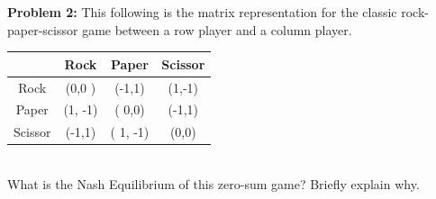 \documentclass[a4paper]{article}
\newif\ifsol
\begin{document}
    \noindent \textbf{Problem 2:} This following is the matrix representation for the classic rock-paper-scissor game between a row player and a column player.\\
    \begin{table}[h]
    	\center
    	\begin{tabular}{|c|c|c|c|}
    		\hline
    	&Rock&Paper&Scissor\\
    		\hline
    		Rock& (0,0 )& (-1,1)& (1,-1)\\
    		\hline
    		Paper&(1, -1)& ( 0,0) & (-1,1)\\
    		\hline
    		Scissor&(-1,1)& ( 1, -1)& (0,0)\\
    		\hline
    	\end{tabular}
    \end{table}\\
    What is the Nash Equilibrium of this zero-sum game? Briefly explain why. \bigskip
    
    \ifsol 
    {\color{blue} \noindent One way to find the solution is to guess the equilibrium to be $(1/3,1/3,1/3)$ and then verify it. But it is hard to guess right in general so we will proceed by using Von Neumann's theorem (which we proved in class), which states that both player's Maximin strategy forms a Nash Equilibrium. \\
    
    \noindent We first compute the Maximin strategy for the row player. Let $p$ be the probability of playing \texttt{Rock} and $q$ be probability for \texttt{Paper}. Then the expected utility for the row player is: 
    	\begin{itemize}
    		\item when column player plays \texttt{Rock}: $q -(1-p-q)$
    		\item when column player plays \texttt{Paper}: $-p + (1-p-q)$
    		\item when column player plays \texttt{Scissor}: $p -q$ 
    	\end{itemize}
    Thus the Maximin strategy $(p^*,q^*, 1-p^* - q^*)$ solves the following optimization problem
    $$ \max_{p,q} \bigg[  \min{   \big\{ q -(1-p-q), -p + (1-p-q), p -q  \big\}  } \bigg]$$
    It is easy to verify that $p^* = q^* = 1/3$ is the optimal solution. Thus the Maximin strategy for the row player is $(1/3,1/3,1/3)$. By symmetry, the Maximin strategy for the column player is also $(1/3,1/3,1/3)$. 
    } 
    \else \bigskip \bigskip \bigskip \bigskip \bigskip \bigskip
    \fi
    \bigskip
    
\end{document}
